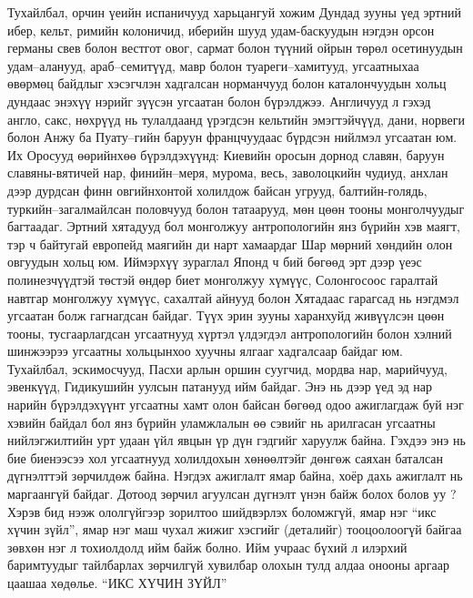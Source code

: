 Тухайлбал, орчин үеийн испаничууд харьцангуй хожим Дундад зууны үед эртний ибер, кельт, римийн колоничид, иберийн шууд удам-баскуудын нэгдэн орсон германы свев болон вестгот овог, сармат болон түүний ойрын төрөл осетинуудын удам–аланууд, араб–семитүүд, мавр болон туареги–хамитууд, угсаатныхаа өвөрмөц байдлыг хэсэгчлэн хадгалсан норманчууд болон каталончуудын хольц дундаас энэхүү нэрийг зүүсэн угсаатан болон бүрэлджээ.
Англичууд л гэхэд англо, сакс, нөхрүүд нь тулалдаанд үрэгдсэн кельтийн эмэгтэйчүүд, дани, норвеги болон Анжу ба Пуату–гийн баруун францчуудаас бүрдсэн нийлмэл угсаатан юм.
Их Оросууд өөрийнхөө бүрэлдэхүүнд: Киевийн оросын дорнод славян, баруун славяны-вятичей нар, финийн–меря, мурома, весь, заволоцкийн чудиуд, анхлан дээр дурдсан финн овгийнхонтой холилдож байсан угрууд, балтийн-голядь, туркийн–загалмайлсан половчууд болон татаарууд, мөн цөөн тооны монголчуудыг багтаадаг.
Эртний хятадууд бол монголжуу антропологийн янз бүрийн хэв маягт, тэр ч байтугай европейд маягийн ди нарт хамаардаг Шар мөрний хөндийн олон овгуудын хольц юм. Иймэрхүү зураглал Японд ч бий бөгөөд эрт дээр үеэс полинезчүүдтэй төстэй өндөр биет монголжуу хүмүүс, Солонгосоос гаралтай навтгар монголжуу хүмүүс, сахалтай айнууд болон Хятадаас гарагсад нь нэгдмэл угсаатан болж гагнагдсан байдаг.
Түүх эрин зууны харанхуйд живүүлсэн цөөн тооны, тусгаарлагдсан угсаатнууд хүртэл үлдэгдэл антропологийн болон хэлний шинжээрээ угсаатны хольцынхоо хуучны ялгааг хадгалсаар байдаг юм. Тухайлбал, эскимосчууд, Пасхи арлын оршин суугчид, мордва нар, марийчууд, эвенкүүд, Гидикушийн уулсын патанууд ийм байдаг. Энэ нь дээр үед эд нар нарийн бүрэлдэхүүнт угсаатны хамт олон байсан бөгөөд одоо ажиглагдаж буй нэг хэвийн байдал бол янз бүрийн уламжлалын өө сэвийг нь арилгасан угсаатны нийлэгжилтийн урт удаан үйл явцын үр дүн гэдгийг харуулж байна.
Гэхдээ энэ нь бие биенээсээ хол угсаатнууд холилдохын хөнөөлтэйг дөнгөж саяхан баталсан дүгнэлттэй зөрчилдөж байна. Нэгдэх ажиглалт ямар байна, хоёр дахь ажиглалт нь маргаангүй байдаг. Дотоод зөрчил агуулсан дүгнэлт үнэн байж болох болов уу ? Хэрэв бид нээж ололгүйгээр зорилтоо шийдвэрлэх боломжгүй, ямар нэг “икс хүчин зүйл”, ямар нэг маш чухал жижиг хэсгийг (деталийг) тооцоолоогүй байгаа зөвхөн нэг л тохиолдолд ийм байж болно. Ийм учраас бүхий л илэрхий баримтуудыг тайлбарлах зөрчилгүй хувилбар олохын тулд алдаа онооны аргаар цаашаа хөдөлье.
“ИКС ХҮЧИН ЗҮЙЛ”
